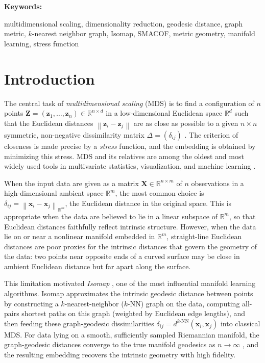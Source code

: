 \documentclass[11pt]{article}
\newcommand{\R}{\mathbb{R}}
\newcommand{\bx}{\mathbf{x}}
\newcommand{\bX}{\mathbf{X}}
\newcommand{\bz}{\mathbf{z}}
\newcommand{\bZ}{\mathbf{Z}}
\newcommand{\norm}[1]{\left\|#1\right\|}
\newcommand{\dknn}{d^{k\text{-NN}}}
\theoremstyle{definition}
\theoremstyle{plain}
\theoremstyle{remark}
\newenvironment{keywords}{%
  \par\smallskip\noindent\textbf{Keywords: }\ignorespaces
}{\par\smallskip}
\begin{document}
\begin{keywords}
  multidimensional scaling, dimensionality reduction, geodesic distance,
  graph metric, $k$-nearest neighbor graph, Isomap, SMACOF, metric geometry,
  manifold learning, stress function
\end{keywords}

\section{Introduction}
\label{sec:introduction}

The central task of \emph{multidimensional scaling} (MDS) is to find a
configuration of $n$ points $\bZ = (\bz_1, \ldots, \bz_n) \in \R^{n \times
d}$ in a low-dimensional Euclidean space $\R^d$ such that the Euclidean
distances $\norm{\bz_i - \bz_j}$ are as close as possible to a given $n
\times n$ symmetric, non-negative dissimilarity matrix $\Delta = (\delta_{ij})$
\citep{torgerson1952multidimensional, kruskal1964multidimensional,
borg2005modern, cox2000multidimensional}.  The criterion of closeness is made
precise by a \emph{stress} function, and the embedding is obtained by
minimizing this stress.  MDS and its relatives are among the oldest and most
widely used tools in multivariate statistics, visualization, and machine
learning \citep{shepard1962analysis, sammon1969nonlinear,
vandermaaten2008tsne, mcinnes2018umap}.

When the input data are given as a matrix $\bX \in \R^{n \times m}$ of $n$
observations in a high-dimensional ambient space $\R^m$, the most common
choice is $\delta_{ij} = \norm{\bx_i - \bx_j}_{\R^m}$, the Euclidean
distance in the original space.  This is appropriate when the data are
believed to lie in a linear subspace of $\R^m$, so that Euclidean distances
faithfully reflect intrinsic structure.  However, when the data lie on or
near a nonlinear manifold embedded in $\R^m$, straight-line Euclidean
distances are poor proxies for the intrinsic distances that govern the
geometry of the data: two points near opposite ends of a curved surface
may be close in ambient Euclidean distance but far apart along the surface.

This limitation motivated \emph{Isomap}
\citep{tenenbaum2000global}, one of the most influential manifold learning
algorithms.  Isomap approximates the intrinsic geodesic distance between
points by constructing a $k$-nearest-neighbor ($k$-NN) graph on the data,
computing all-pairs shortest paths on this graph (weighted by Euclidean
edge lengths), and then feeding these graph-geodesic dissimilarities
$\delta_{ij} = \dknn(\bx_i, \bx_j)$ into classical MDS.  For data lying on
a smooth, sufficiently sampled Riemannian manifold, the graph-geodesic
distances converge to the true manifold geodesics as $n \to \infty$
\citep{bernstein2000graph, tenenbaum2000global}, and the resulting embedding
recovers the intrinsic geometry with high fidelity.
\end{document}
